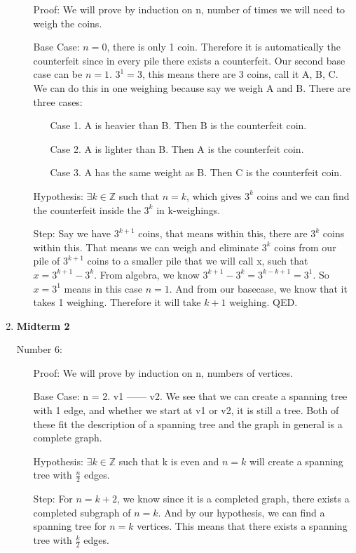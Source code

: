 \documentclass[12pt,fleqn]{article}
\begin{document}
\begin{enumerate}
	\begin{enumerate}
		\item[Proof:] We will prove by induction on n, number of times we will need to weigh the coins.
		\item[Base Case:] $n = 0$, there is only 1 coin. Therefore it is automatically the counterfeit since in every pile there exists a counterfeit. Our second base case can be $n = 1$. $3^1 = 3$, this means there are 3 coins, call it A, B, C. We can do this in one weighing because say we weigh A and B. There are three cases:
		\begin{enumerate}
			\item[Case 1.] A is heavier than B. Then B is the counterfeit coin.
			\item[Case 2.] A is lighter than B. Then A is the counterfeit coin.
			\item[Case 3.] A has the same weight as B. Then C is the counterfeit coin. 
		\end{enumerate}
		\item[Hypothesis:] $\exists k \in \mathbb{Z}$ such that $n = k$, which gives $3^k$ coins and we can find the counterfeit inside the $3^k$ in k-weighings. 
		\item[Step:] Say we have $3^{k+1}$ coins, that means within this, there are $3^k$ coins within this. That means we can weigh and eliminate $3^k$ coins from our pile of $3^{k+1}$ coins to a smaller pile that we will call x, such that $x = 3^{k+1} - 3^k$. From algebra, we know $3^{k+1} - 3^k = 3^{k-k+1} = 3^1$. So $x = 3^1$ means in this case $n = 1$. And from our basecase, we know that it takes 1 weighing. Therefore it will take $k + 1$ weighing. QED.
	\end{enumerate}
  
  
  \newpage
  \item \textbf{Midterm 2}

  Number 6:
  
  \begin{enumerate}
  	\item[Proof:] We will prove by induction on n, numbers of vertices. 
  	\item[Base Case:] n = 2. v1 ------ v2. We see that we can create a spanning tree with 1 edge, and whether we start at v1 or v2, it is still a tree. Both of these fit the description of a spanning tree and the graph in general is a complete graph.
  	\item[Hypothesis:] $\exists k \in \mathbb{Z}$ such that k is even and $n = k$ will create a spanning tree with $\frac{n}{2}$ edges.
  	\item[Step:] For $n = k+2$, we know since it is a completed graph, there exists a completed subgraph of $n = k$. And by our hypothesis, we can find a spanning tree for $n = k$ vertices. This means that there exists a spanning tree with $\frac{k}{2}$ edges. 
  	

\end{enumerate}
\end{enumerate}
\end{document}
